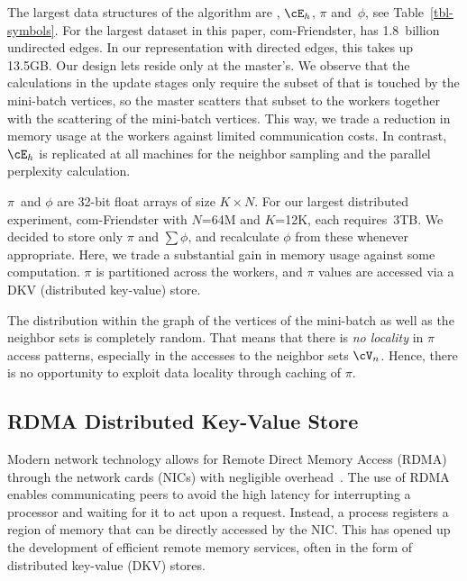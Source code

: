 The largest data structures of the algorithm are \Edges, $\cE_h$, $\pi$
and~$\phi$, see Table~\ref{tbl-symbols}.
For the largest dataset in this paper, com-Friendster, \Edges has 1.8~billion
undirected edges. In our representation with directed edges, this takes
up 13.5GB. Our design lets \Edges reside only at the master's. We observe that
the calculations in the update stages only require the subset of \Edges that
is touched by the mini-batch vertices, so the master scatters that subset to
the workers together with the scattering of the mini-batch vertices. This way,
we trade a reduction in memory usage at the workers against limited
communication costs. In contrast, $\cE_h$ is replicated at
all machines for the neighbor sampling and the parallel perplexity calculation.

$\pi$~and $\phi$ are 32-bit float arrays of size $K \times N$. For our
largest distributed experiment, com-Friendster with $N$=64M and $K$=12K, each
requires~3TB. We decided to store only $\pi$ and $\sum\phi$, and recalculate
$\phi$ from these whenever appropriate. Here, we trade a substantial gain
in memory usage against some computation. $\pi$ is partitioned across the workers,
and $\pi$ values are accessed via a DKV (distributed key-value) store.


The distribution within the graph of the vertices of the mini-batch as well as
the neighbor sets is completely random. That means that there is \textit{no
locality}
in $\pi$ access patterns, especially in the accesses to the neighbor sets
$\Neighbors$.
Hence, there is no opportunity to exploit data locality through caching of
$\pi$.

\subsection{RDMA Distributed Key-Value Store}

Modern network technology allows for Remote Direct Memory Access (RDMA)
through the network cards (NICs) with negligible
overhead~\cite{Hamada_infinibandtrade,Beck:2011:PER:2043535.2043537}. The use
of RDMA enables communicating peers to avoid the high latency for
interrupting a processor and waiting for it to act upon a request. Instead, a
process registers a region of memory that can be directly accessed by the
NIC. %
This has opened up the development of
efficient remote memory services, often in the form of distributed key-value
(DKV) stores.

